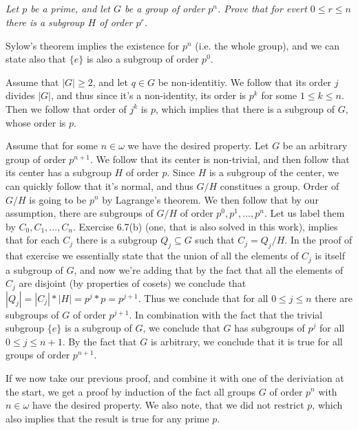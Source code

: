 \documentclass[11pt,oneside,titlepage]{book}
\newcommand{\set}[1]{\{ #1 \}}
\begin{document}
\subsection{}

\textit{Let $p$ be a prime, and let $G$ be a group of order $p^n$. Prove
  that for evert $0 \leq r \leq n$ there is a subgroup $H$ of order $p^r$.}

Sylow's theorem implies the existence for $p^n$ (i.e. the whole group), and
we can state also that $\set{e}$ is also a subgroup of order $p^0$.

Assume that $|G| \geq 2$, and let $q \in G$ be non-identitiy. We
follow that its order $j$ divides $|G|$, and thus since it's a
non-identity, its order is $p^k$ for some $1 \leq k \leq n$. Then we
follow that order of $j^k$ is $p$, which implies that there is a
subgroup of $G$, whose order is $p$.

Assume that for some $n \in \omega$ we have the desired property.
Let $G$ be an arbitrary group of order $p^{n + 1}$. We follow that
its center is non-trivial, and then follow that its center has
a subgroup $H$ of order $p$. Since $H$ is a subgroup of the center,
we can quickly follow that it's normal, and thus $G/H$ constitues
a group. Order of $G/H$ is going to be $p^n$ by Lagrange's theorem. We
then follow that by our assumption, there are subgroups of $G/H$
of order $p^0, p^1, ..., p^n$. Let us label them by $C_0, C_1, ...,
C_n$. Exercise 6.7(b) (one, that is also solved in this work),
implies that for each $C_j$ there is a subgroup $Q_j \subseteq G$
such that $C_j = Q_j / H$. In the proof of that exercise we
essentially state that the union of all the elements of $C_j$ is
itself a subgroup of $G$, and now we're adding that by the fact that
all the elements of $C_j$ are disjoint (by properties of cosets) we
conclude that $|Q_j| = |C_j| * |H| = p^j * p = p^{j + 1}$. Thus we
conclude that for all $0 \leq j \leq n$ there are subgroups
of $G$ of order $p^{j + 1}$. In combination with the fact that
the trivial subgroup $\set{e}$ is a subgroup of $G$, we
conclude that $G$ has subgroups of $p^j$ for all $0 \leq j \leq n + 1$.
By the fact that $G$ is arbitrary, we conclude that it is true for
all groups of order $p^{n + 1}$.

If we now take our previous proof, and combine it with one of the
deriviation at the start, we get a proof by induction of the fact all
groups $G$ of order $p^n$ with $n \in \omega$ have the desired
property. We also note, that we did not restrict $p$, which also
implies that the result is true for any prime $p$.
\end{document}
